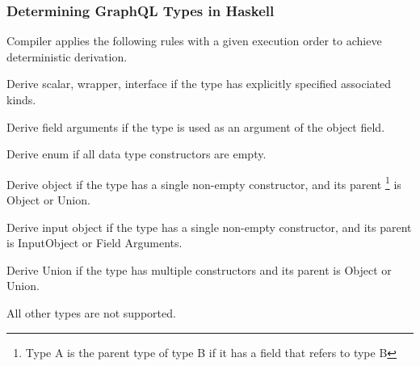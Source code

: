 \begin{frame}\frametitle{Determining GraphQL Types in Haskell}

Compiler applies the following rules with a given execution order to achieve deterministic derivation.

\begin{enumerate}

   Derive scalar, wrapper, interface if the type has explicitly specified associated kinds. 

   Derive field arguments if the type is used as an argument of the object field. 

   Derive enum if all data type constructors are empty.

   Derive object if the type has a single non-empty constructor, and its parent \footnote{Type A is the parent type of type B if it has a field that refers to type B} is Object or Union. 
  
   Derive input object if the type has a single non-empty constructor, and its parent is InputObject or Field Arguments.

   Derive Union if the type has multiple constructors and its parent is Object or Union.

   All other types are not supported.

\end{enumerate}

\end{frame}
